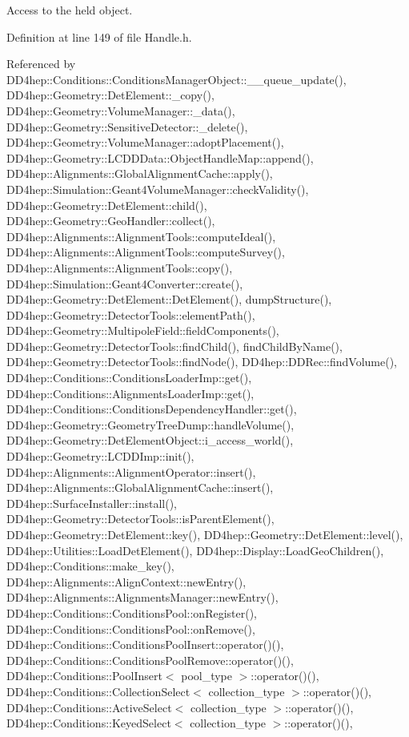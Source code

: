 Access to the held object. 



Definition at line 149 of file Handle.\+h.



Referenced by D\+D4hep\+::\+Conditions\+::\+Conditions\+Manager\+Object\+::\+\_\+\+\_\+queue\+\_\+update(), D\+D4hep\+::\+Geometry\+::\+Det\+Element\+::\+\_\+copy(), D\+D4hep\+::\+Geometry\+::\+Volume\+Manager\+::\+\_\+data(), D\+D4hep\+::\+Geometry\+::\+Sensitive\+Detector\+::\+\_\+delete(), D\+D4hep\+::\+Geometry\+::\+Volume\+Manager\+::adopt\+Placement(), D\+D4hep\+::\+Geometry\+::\+L\+C\+D\+D\+Data\+::\+Object\+Handle\+Map\+::append(), D\+D4hep\+::\+Alignments\+::\+Global\+Alignment\+Cache\+::apply(), D\+D4hep\+::\+Simulation\+::\+Geant4\+Volume\+Manager\+::check\+Validity(), D\+D4hep\+::\+Geometry\+::\+Det\+Element\+::child(), D\+D4hep\+::\+Geometry\+::\+Geo\+Handler\+::collect(), D\+D4hep\+::\+Alignments\+::\+Alignment\+Tools\+::compute\+Ideal(), D\+D4hep\+::\+Alignments\+::\+Alignment\+Tools\+::compute\+Survey(), D\+D4hep\+::\+Alignments\+::\+Alignment\+Tools\+::copy(), D\+D4hep\+::\+Simulation\+::\+Geant4\+Converter\+::create(), D\+D4hep\+::\+Geometry\+::\+Det\+Element\+::\+Det\+Element(), dump\+Structure(), D\+D4hep\+::\+Geometry\+::\+Detector\+Tools\+::element\+Path(), D\+D4hep\+::\+Geometry\+::\+Multipole\+Field\+::field\+Components(), D\+D4hep\+::\+Geometry\+::\+Detector\+Tools\+::find\+Child(), find\+Child\+By\+Name(), D\+D4hep\+::\+Geometry\+::\+Detector\+Tools\+::find\+Node(), D\+D4hep\+::\+D\+D\+Rec\+::find\+Volume(), D\+D4hep\+::\+Conditions\+::\+Conditions\+Loader\+Imp\+::get(), D\+D4hep\+::\+Conditions\+::\+Alignments\+Loader\+Imp\+::get(), D\+D4hep\+::\+Conditions\+::\+Conditions\+Dependency\+Handler\+::get(), D\+D4hep\+::\+Geometry\+::\+Geometry\+Tree\+Dump\+::handle\+Volume(), D\+D4hep\+::\+Geometry\+::\+Det\+Element\+Object\+::i\+\_\+access\+\_\+world(), D\+D4hep\+::\+Geometry\+::\+L\+C\+D\+D\+Imp\+::init(), D\+D4hep\+::\+Alignments\+::\+Alignment\+Operator\+::insert(), D\+D4hep\+::\+Alignments\+::\+Global\+Alignment\+Cache\+::insert(), D\+D4hep\+::\+Surface\+Installer\+::install(), D\+D4hep\+::\+Geometry\+::\+Detector\+Tools\+::is\+Parent\+Element(), D\+D4hep\+::\+Geometry\+::\+Det\+Element\+::key(), D\+D4hep\+::\+Geometry\+::\+Det\+Element\+::level(), D\+D4hep\+::\+Utilities\+::\+Load\+Det\+Element(), D\+D4hep\+::\+Display\+::\+Load\+Geo\+Children(), D\+D4hep\+::\+Conditions\+::make\+\_\+key(), D\+D4hep\+::\+Alignments\+::\+Align\+Context\+::new\+Entry(), D\+D4hep\+::\+Alignments\+::\+Alignments\+Manager\+::new\+Entry(), D\+D4hep\+::\+Conditions\+::\+Conditions\+Pool\+::on\+Register(), D\+D4hep\+::\+Conditions\+::\+Conditions\+Pool\+::on\+Remove(), D\+D4hep\+::\+Conditions\+::\+Conditions\+Pool\+Insert\+::operator()(), D\+D4hep\+::\+Conditions\+::\+Conditions\+Pool\+Remove\+::operator()(), D\+D4hep\+::\+Conditions\+::\+Pool\+Insert$<$ pool\+\_\+type $>$\+::operator()(), D\+D4hep\+::\+Conditions\+::\+Collection\+Select$<$ collection\+\_\+type $>$\+::operator()(), D\+D4hep\+::\+Conditions\+::\+Active\+Select$<$ collection\+\_\+type $>$\+::operator()(), D\+D4hep\+::\+Conditions\+::\+Keyed\+Select$<$ collection\+\_\+type $>$\+::operator()(), 